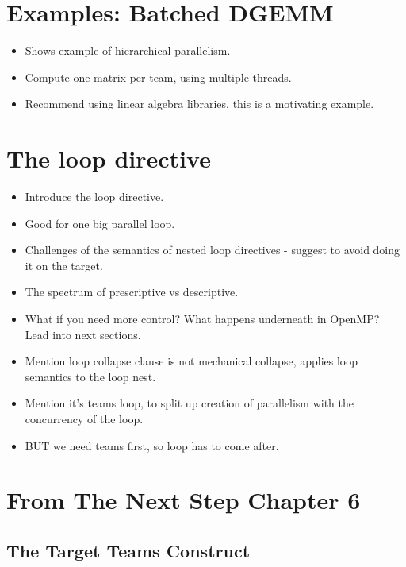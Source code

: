 \section{Examples: Batched DGEMM}
\begin{itemize}
  \item Shows example of hierarchical parallelism.
  \item Compute one matrix per team, using multiple threads.
  \item Recommend using linear algebra libraries, this is a motivating example.
\end{itemize}

\section{The loop directive}
\label{sec:loop}
\begin{itemize}
  \item Introduce the loop directive.
  \item Good for one big parallel loop.
  \item Challenges of the semantics of nested loop directives - suggest to avoid doing it on the target.
  \item The spectrum of prescriptive vs descriptive.
  \item What if you need more control? What happens underneath in OpenMP? Lead into next sections.
  \item Mention loop collapse clause is not mechanical collapse, applies loop semantics to the loop nest.
  \item Mention it's teams loop, to split up creation of parallelism with the concurrency of the loop.
  \item BUT we need teams first, so loop has to come after.
\end{itemize}


\section{From The Next Step Chapter 6}
\subsection{The Target Teams Construct}
\label{sec:06.teams-construct}

